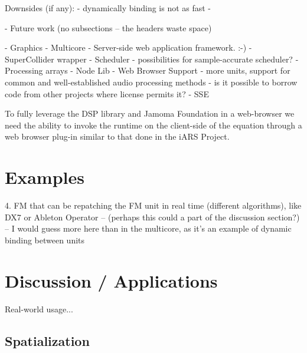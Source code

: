 \documentclass[twoside,10pt]{article}
\begin{document}
    Downsides (if any):
        -  dynamically binding is not as fast
        - 
    
- Future work (no subsections -- the headers waste space)

    - Graphics
    - Multicore
    - Server-side web application framework. :-)
    - SuperCollider wrapper
    - Scheduler - possibilities for sample-accurate scheduler?
    - Processing arrays
    - Node Lib
    - Web Browser Support
    - more units, support for common and well-established audio processing methods -  is it possible to borrow code from other projects where license permits it?
    - SSE
    
    



To fully leverage the DSP library and Jamoma Foundation in a web-browser we need the ability to invoke the runtime on the client-side of the equation through a web browser plug-in similar to that done in the iARS Project\cite{Frauenberger:2003}.



\section{Examples} %

4. FM that can be repatching the FM unit in real time (different algorithms), like DX7 or Ableton Operator  -- (perhaps this could a part of the discussion section?) -- I would guess more here than in the multicore, as it's an example of dynamic binding between units





\section{Discussion / Applications} %

Real-world usage...

\subsection{Spatialization}
\end{document}
